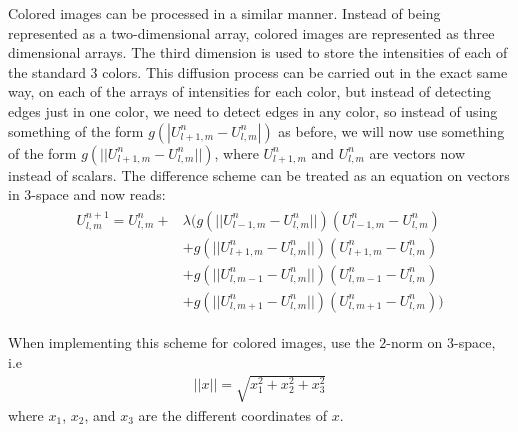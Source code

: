 Colored images can be processed in a similar manner.
Instead of being represented as a two-dimensional array, colored images are represented as three dimensional arrays.
The third dimension is used to store the intensities of each of the standard 3 colors.
This diffusion process can be carried out in the exact same way, on each of the arrays of intensities for each color, but instead of detecting edges just in one color, we need to detect edges in any color, so instead of using something of the form $g(|U_{l+1,m}^n - U_{l,m}^n|)$ as before, we will now use something of the form $g(||U_{l+1,m}^n - U_{l,m}^n||)$, where $U_{l+1,m}^n$ and $U_{l,m}^n$ are vectors now instead of scalars.
The difference scheme can be treated as an equation on vectors in 3-space and now reads:
\begin{align}
\begin{split}
U_{l,m}^{n+1} = U_{l,m}^n + & \lambda (g(||U_{l-1,m}^n - U_{l,m}^n||)(U_{l-1,m}^n - U_{l,m}^n) \\
					& + g(||U_{l+1,m}^n - U_{l,m}^n||)(U_{l+1,m}^n - U_{l,m}^n) \\
					& + g(||U_{l,m-1}^n - U_{l,m}^n||)(U_{l,m-1}^n - U_{l,m}^n) \\
					& + g(||U_{l,m+1}^n - U_{l,m}^n||)(U_{l,m+1}^n - U_{l,m}^n))
\end{split}
\label{eqn:anisotropic:diffuse_image}
\end{align}

When implementing this scheme for colored images, use the $2$-norm on 3-space, i.e 
\begin{align}
||x||=\sqrt{x_1^2+x_2^2+x_3^2}
\label{eqn:anisotropic:2norm_3space}
\end{align}
 where $x_1$, $x_2$, and $x_3$ are the different coordinates of $x$.

